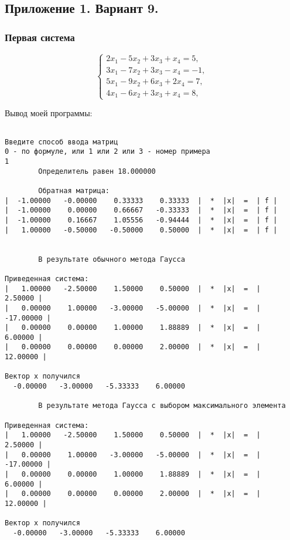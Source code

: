 \documentclass[a4paper,12pt,titlepage,finall]{article}
\begin{document}
\subsection{Приложение 1. Вариант 9.}
\subsubsection{Первая система}

\begin{equation*}
 \begin{cases}
   2x_1 - 5x_2 + 3x_3 + x_4 = 5, 
   \\
   3x_1 - 7x_2 + 3x_3 - x_4 = -1,
   \\
   5x_1 - 9x_2 + 6x_3 + 2x_4 = 7,
   \\
   4x_1 - 6x_2 + 3x_3 + x_4 = 8,
 \end{cases}
\end{equation*}

Вывод моей программы:

\begin{verbatim}

Введите способ ввода матриц
0 - по формуле, или 1 или 2 или 3 - номер примера
1
        Определитель равен 18.000000

        Обратная матрица:
|  -1.00000   -0.00000    0.33333    0.33333  |  *  |x|  =  | f |
|  -1.00000    0.00000    0.66667   -0.33333  |  *  |x|  =  | f |
|  -1.00000    0.16667    1.05556   -0.94444  |  *  |x|  =  | f |
|   1.00000   -0.50000   -0.50000    0.50000  |  *  |x|  =  | f |


        В результате обычного метода Гаусса

Приведенная система:
|   1.00000   -2.50000    1.50000    0.50000  |  *  |x|  =  |   2.50000 |
|   0.00000    1.00000   -3.00000   -5.00000  |  *  |x|  =  | -17.00000 |
|   0.00000    0.00000    1.00000    1.88889  |  *  |x|  =  |   6.00000 |
|   0.00000    0.00000    0.00000    2.00000  |  *  |x|  =  |  12.00000 |

Вектор х получился
  -0.00000   -3.00000   -5.33333    6.00000 

        В результате метода Гаусса с выбором максимального элемента

Приведенная система:
|   1.00000   -2.50000    1.50000    0.50000  |  *  |x|  =  |   2.50000 |
|   0.00000    1.00000   -3.00000   -5.00000  |  *  |x|  =  | -17.00000 |
|   0.00000    0.00000    1.00000    1.88889  |  *  |x|  =  |   6.00000 |
|   0.00000    0.00000    0.00000    2.00000  |  *  |x|  =  |  12.00000 |

Вектор х получился
  -0.00000   -3.00000   -5.33333    6.00000 

\end{verbatim}
\end{document}
